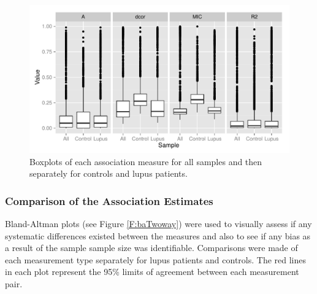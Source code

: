 \documentclass[a4paper, 12pt]{report}
\begin{document}
\begin{figure}[H]
\begin{center}
\includegraphics[width=\textwidth]{associationBox.pdf}
\caption{Boxplots of each association measure for all samples and then separately for controls and lupus patients.} 
\label{F:associationBox}
\end{center}
\end{figure}






\subsubsection{Comparison of the Association Estimates}
Bland-Altman \cite{Altman1983} plots (see Figure \ref{F:baTwoway}) were used to visually assess if any systematic differences existed between the measures and also to see if any bias as a result of the sample sample size was identifiable. Comparisons were made of each measurement type separately for lupus patients and controls. The red lines in each plot represent the 95\% limits of agreement between each measurement pair. 
\end{document}
